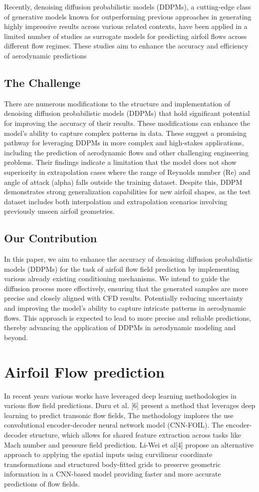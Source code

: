 \documentclass{CUP-JNL-DTM}%
\theoremstyle{definition}
\numberwithin{equation}{section}
\begin{document}
Recently, denoising diffusion probabilistic models (DDPMs), a cutting-edge class of generative models known for outperforming previous approaches in generating highly impressive results across various related contexts, have been applied in a limited number of studies as surrogate models for predicting airfoil flows across different flow regimes. These studies aim to enhance the accuracy and efficiency of aerodynamic predictions


\subsection{The Challenge}
There are numerous modifications to the structure and implementation of denoising diffusion probabilistic models (DDPMs) that hold significant potential for improving the accuracy of their results. These modifications can enhance the model's ability to capture complex patterns in data. These suggest a promising pathway for leveraging DDPMs in more complex and high-stakes applications, including the prediction of aerodynamic flows and other challenging engineering problems. Their findings indicate a limitation that the model does not show superiority in extrapolation cases where the range of Reynolds number (Re) and angle of attack (alpha) falls outside the training dataset. Despite this, DDPM demonstrates strong generalization capabilities for new airfoil shapes, as the test dataset includes both interpolation and extrapolation scenarios involving previously unseen airfoil geometries.

\subsection{Our Contribution}
In this paper, we aim to enhance the accuracy of denoising diffusion probabilistic models (DDPMs) for the task of airfoil flow field prediction by implementing various already existing conditioning mechanisms. We intend to guide the diffusion process more effectively, ensuring that the generated samples are more precise and closely aligned with CFD results. Potentially reducing uncertainty and improving the model's ability to capture intricate patterns in aerodynamic flows. This approach is expected to lead to more precise and reliable predictions, thereby advancing the application of DDPMs in aerodynamic modeling and beyond.
\section{Airfoil Flow prediction}
In recent years various works have leveraged deep learning methodologies in various flow field predictions. Duru et al. [6] present a method that leverages deep learning to predict transonic flow fields,  The methodology implores the use convolutional encoder-decoder neural network model (CNN-FOIL). The encoder-decoder structure, which allows for shared feature extraction across tasks like Mach number and pressure field prediction. Li-Wei et al[4] propose an alternative approach to applying the spatial inputs using curvilinear coordinate transformations and structured body-fitted grids to preserve geometric information in a CNN-based model providing faster and more accurate predictions of flow fields.
\end{document}
